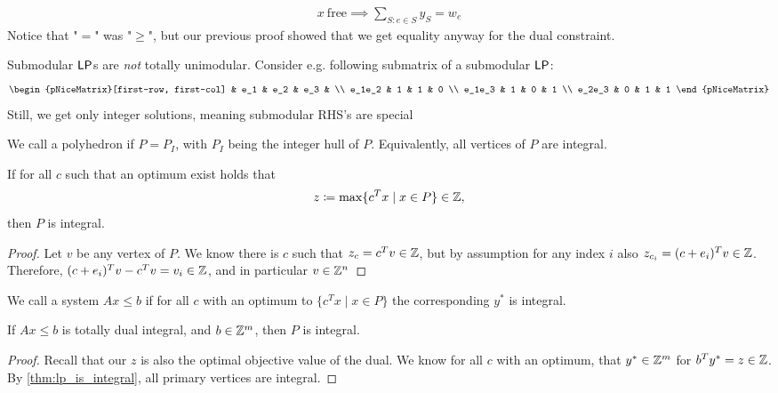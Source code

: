 \begin{align*}
    x\ \text{free} \implies \sum_{S:e \in S}y_S = w_e
\end{align*}
Notice that "$=$" was "$\geq$", but our previous proof showed that we
get equality anyway for the dual constraint.
\begin{remark}
    Submodular $\mathsf{LP}$s are \emph{not} totally unimodular.
    Consider e.g. following submatrix of a submodular $\mathsf{LP}$:
    \[
    \begin{pNiceMatrix}[first-row, first-col]
               & e_1          & e_2 & e_3 &  \\
        e_1e_2    & 1            & 1   & 0      \\
        e_1e_3    &  1            & 0   & 1      \\
        e_2e_3    &   0           & 1    & 1     
        \end{pNiceMatrix}
    \]
    Still, we get only integer solutions, meaning submodular RHS's are special
\end{remark}
\begin{definition}
    We call a polyhedron  if $P=P_I$, with $P_I$ being the
    integer hull of $P$.
    Equivalently, all vertices of $P$ are integral.
\end{definition}
\begin{theorem} \label{thm:lp_is_integral}
    If for all $c$ such that an optimum exist holds that
    \begin{align*}
        z \coloneqq \max \{c^Tx \mid x \in P\} \in \mathbb{Z},
    \end{align*}
    then $P$ is integral.
\end{theorem}
\begin{proof}
    Let $v$ be any vertex of $P$. We know there is $c$ such that $z_c = c^Tv \in \mathbb{Z}$, but by assumption for any index $i$ also 
    $z_{c_i}=(c+e_i)^Tv \in \mathbb{Z}$. Therefore, $(c+e_i)^Tv-c^Tv=v_i\in \mathbb{Z}$,
    and in particular $v \in \mathbb{Z}^n$
\end{proof}
\begin{definition}
    We call a system $Ax \leq b$  if for all $c$ with an optimum to $\{c^Tx \mid x \in P\}$ 
    the corresponding $y^*$ is integral.
\end{definition}
\begin{corollary}
    If $Ax \leq b$ is totally dual integral, and $b \in \mathbb{Z}^m$, then $P$ is integral.
\end{corollary}
\begin{proof}
    Recall that our $z$ is also the optimal objective value of the dual.
    We know for all $c$ with an optimum, that $y^* \in \mathbb{Z}^m$ for $b^Ty^* = z \in \mathbb{Z}$.
    By \autoref{thm:lp_is_integral}, all primary vertices are integral.
\end{proof}
